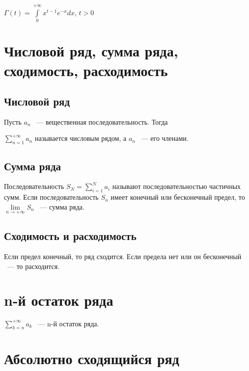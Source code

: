 \documentclass{article}
\begin{document}
        $\Gamma(t) = \int\limits^{+\infty}_0 x^{t - 1} e^{-x} dx$, $t > 0$
        
    \newpage
    
    \section{Числовой ряд, сумма ряда, сходимость, расходимость}
    
        \subsection{Числовой ряд}
        
            Пусть $a_n$ ~--- вещественная последовательность. Тогда
            
            $\sum\limits_{n = 1}^{+\infty} a_n$ называется числовым рядом, а $a_n$ ~--- его членами. 
            
        \subsection{Сумма ряда}
        
            Последовательность $S_N = \sum\limits_{i = 1}^N a_i$ называют последовательностью частичных сумм. Если последовательность $S_n$ имеет конечный или бесконечный предел, то $\lim\limits_{n \rightarrow +\infty} S_n$ ~--- сумма ряда.
            
        \subsection{Сходимость и расходимость}
        
            Если предел конечный, то ряд сходится. Если предела нет или он бесконечный ~--- то расходится.
            
    \newpage
    
    \section{n-й остаток ряда}
    
        $\sum\limits_{k = n}^{+\infty} a_k$ ~--- n-й остаток ряда.
        
    \newpage
    
    \section{Абсолютно сходящийся ряд}
    
\end{document}
